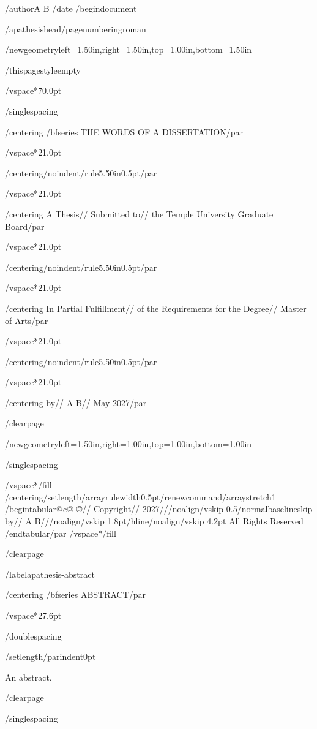 /author{A B}
/date{}
/begin{document}


/apathesishead/pagenumbering{roman}

/newgeometry{left=1.50in,right=1.50in,top=1.00in,bottom=1.50in}

/thispagestyle{empty}

/vspace*{70.0pt}

/singlespacing

{/centering
/bfseries THE WORDS OF A DISSERTATION/par}

/vspace*{21.0pt}

{/centering/noindent/rule{5.50in}{0.5pt}/par}

/vspace*{21.0pt}

{/centering
A Thesis//
Submitted to//
the Temple University Graduate Board/par}

/vspace*{21.0pt}

{/centering/noindent/rule{5.50in}{0.5pt}/par}

/vspace*{21.0pt}

{/centering
In Partial Fulfillment//
of the Requirements for the Degree//
Master of Arts/par}

/vspace*{21.0pt}

{/centering/noindent/rule{5.50in}{0.5pt}/par}

/vspace*{21.0pt}

{/centering
by//
A B//
May 2027/par}

/clearpage

/newgeometry{left=1.50in,right=1.00in,top=1.00in,bottom=1.00in}

/singlespacing

/vspace*{/fill}
{/centering/setlength{/arrayrulewidth}{0.5pt}/renewcommand{/arraystretch}{1}
/begin{tabular}{@{}c@{}}
©//
Copyright//
2027///noalign{/vskip 0.5/normalbaselineskip}
by//
A B///noalign{/vskip 1.8pt}/hline/noalign{/vskip 4.2pt}
All Rights Reserved
/end{tabular}/par}
/vspace*{/fill}

/clearpage

/label{apathesis-abstract}

{/centering
/bfseries ABSTRACT/par}

/vspace*{27.6pt}

/doublespacing

{/setlength{/parindent}{0pt}

An abstract.

}

/clearpage

/singlespacing

